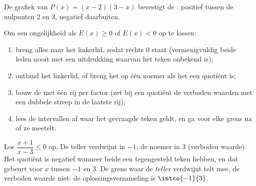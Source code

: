 \begin{omfigure}

{\small De grafiek van $P(x) = (x-2)(3-x)$ bevestigt de : positief
tussen de nulpunten $2$ en $3$, negatief daarbuiten.}
\end{omfigure}

\begin{method}\label{met:g10:algebra:signtable}
Om een ongelijkheid als $E(x) \geq 0$ of $E(x) < 0$ op te lossen:
\begin{enumerate}
  \item breng alles naar het linkerlid, zodat rechts $0$ staat
        (vermenigvuldig beide leden nooit met een uitdrukking waarvan het
        teken onbekend is);
  \item ontbind het linkerlid, of breng het op één noemer als het een
        quotiënt is;
  \item bouw de  met één rij per factor (zet bij een quotiënt de
        verboden waarden met een dubbele streep in de laatste rij);
  \item lees de intervallen af waar het gevraagde teken geldt, en ga voor
        elke grens na of ze meetelt.
\end{enumerate}
\end{method}

\begin{example}\label{ex:g10:algebra:quotientineq}
Los $\dfrac{x + 1}{x - 3} \leq 0$ op. De teller verdwijnt in $-1$, de noemer
in $3$ (verboden waarde). Het quotiënt is negatief wanneer beide een
tegengesteld teken hebben, en dat gebeurt voor $x$ tussen $-1$ en $3$. De
grens waar de \emph{teller} verdwijnt telt mee, de verboden waarde niet: de
oplossingsverzameling is $\intco{-1}{3}$.
\end{example}

